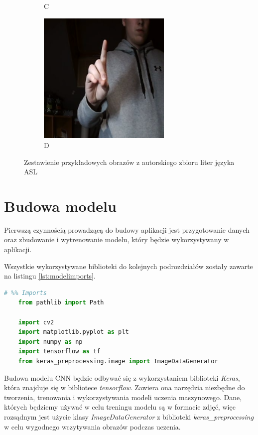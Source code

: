 \documentclass[a4paper,12pt,oneside]{book} %
\begin{document}
\begin{figure}[h]
\begin{subfigure}{0.4\textwidth}
			\caption{C}
		\end{subfigure}
		\begin{subfigure}{0.4\textwidth}
			\centering
			\includegraphics[width=0.7\textwidth]{asl_d.png}
			\caption{D}
		\end{subfigure}
	\caption{Zestawienie przykładowych obrazów z autorskiego zbioru liter języka ASL}
	\label{asl_own_photos}
\end{figure}

\section{Budowa modelu}

Pierwszą czynnością prowadzącą do budowy aplikacji jest przygotowanie danych oraz zbudowanie i wytrenowanie modelu, który będzie wykorzystywany w aplikacji.

Wszystkie wykorzystywane biblioteki do kolejnych podrozdziałów zostały zawarte na listingu \ref{lst:modelimports}.

\begin{lstlisting}[language=Python, caption={Importowane biblioteki}, label={lst:modelimports}]
	# %% Imports
	from pathlib import Path
	
	import cv2
	import matplotlib.pyplot as plt
	import numpy as np
	import tensorflow as tf
	from keras_preprocessing.image import ImageDataGenerator
\end{lstlisting}

Budowa modelu CNN będzie odbywać się z wykorzystaniem biblioteki \emph{Keras}, która znajduje się w bibliotece \emph{tensorflow}. Zawiera ona narzędzia niezbędne do tworzenia, trenowania i wykorzystywania modeli uczenia maszynowego. Dane, których będziemy używać w celu treningu modelu są w formacie zdjęć, więc rozsądnym jest użycie klasy \emph{ImageDataGenerator} z biblioteki \emph{keras\_preprocessing} w celu wygodnego wczytywania obrazów podczas uczenia. 
\end{document}
